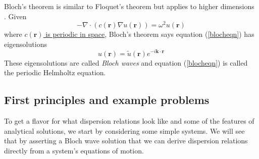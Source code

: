 \documentclass{article}
\begin{document}
Bloch's theorem is similar to Floquet's theorem but applies to higher 
dimensions \cite{laude15}. Given
\begin{equation} \label{blocheqn}
-\nabla \cdot \left( c(\mathbf{r}) \nabla u(\mathbf{r}) \right) = \omega^2 
u(\mathbf{r})
\end{equation}
where \underline{$c(\mathbf{r})$ is periodic in space}, Bloch's theorem says 
equation (\ref{blocheqn}) has eigensolutions
\begin{equation}
u(\mathbf{r}) = \tilde{u}(\mathbf{r}) e^{-i\mathbf{k} \cdot \mathbf{r}} 
\end{equation}
These eigensolutions are called \emph{Bloch waves} and equation 
(\ref{blocheqn}) is called the periodic Helmholtz equation.

\subsection{First principles and example problems}
To get a flavor for what dispersion relations look like and some of the 
features of analytical solutions, we start by considering some simple 
systems. We will see that by asserting a Bloch wave solution that we can derive 
dispersion relations directly from a system's equations of motion.
\end{document}
